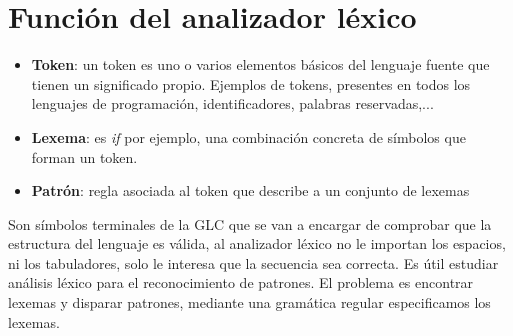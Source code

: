 \section{Función del analizador léxico}
\begin{itemize}
	\item \textbf{Token}: un token es uno o varios elementos básicos del lenguaje fuente que tienen un significado propio. Ejemplos de tokens, presentes en todos los lenguajes de programación, identificadores, palabras reservadas,...
	\item \textbf{Lexema}: es \textit{if} por ejemplo, una combinación concreta de símbolos que forman un token.
	\item \textbf{Patrón}: regla asociada al token que describe a un conjunto de lexemas
\end{itemize}
Son símbolos terminales de la GLC que se van a encargar de comprobar que la estructura del lenguaje es válida, al analizador léxico no le importan los espacios, ni los tabuladores, solo le interesa que la secuencia sea correcta.
\newline
\newline
Es útil estudiar análisis léxico para el reconocimiento de patrones.
\newline
\newline
El problema es encontrar lexemas y disparar patrones, mediante una gramática regular especificamos los lexemas.

